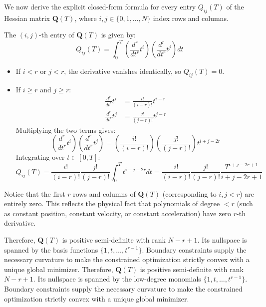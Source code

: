 \documentclass[11pt,a4paper]{article}
\begin{document}
We now derive the explicit closed-form formula for every entry $Q_{ij}(T)$ of the Hessian matrix $\mathbf{Q}(T)$, where $i, j \in \{0, 1, \dots, N\}$ index rows and columns.

\begin{definitionbox}
The $(i, j)$-th entry of $\mathbf{Q}(T)$ is given by:
\begin{equation}
Q_{ij}(T) = \int_0^T \left( \frac{d^r}{dt^r} t^i \right) \left( \frac{d^r}{dt^r} t^j \right) dt
\end{equation}
\begin{itemize}
    \item If $i < r$ or $j < r$, the derivative vanishes identically, so $Q_{ij}(T) = 0$.
    \item If $i \ge r$ and $j \ge r$:
    \begin{align}
    \frac{d^r}{dt^r} t^i &= \frac{i!}{(i-r)!} t^{i-r} \\
    \frac{d^r}{dt^r} t^j &= \frac{j!}{(j-r)!} t^{j-r}
    \end{align}
    Multiplying the two terms gives:
    \begin{equation}
    \left( \frac{d^r}{dt^r} t^i \right) \left( \frac{d^r}{dt^r} t^j \right) = \left( \frac{i!}{(i-r)!} \right) \left( \frac{j!}{(j-r)!} \right) t^{i + j - 2r}
    \end{equation}
    Integrating over $t \in [0, T]$:
    \begin{equation}
    \label{eq:Q_formula}
    Q_{ij}(T) = \frac{i!}{(i-r)!} \frac{j!}{(j-r)!} \int_0^T t^{i + j - 2r} dt
    = \frac{i!}{(i-r)!} \frac{j!}{(j-r)!} \frac{T^{i + j - 2r + 1}}{i + j - 2r + 1}
    \end{equation}
\end{itemize}
\end{definitionbox}

\begin{intuitionbox}
Notice that the first $r$ rows and columns of $\mathbf{Q}(T)$ (corresponding to $i, j < r$) are entirely zero. This reflects the physical fact that polynomials of degree $< r$ (such as constant position, constant velocity, or constant acceleration) have zero $r$-th derivative. 

Therefore, $\mathbf{Q}(T)$ is positive semi-definite with rank $N - r + 1$. Its nullspace is spanned by the basis functions $\{1, t, \dots, t^{r-1}\}$. Boundary constraints supply the necessary curvature to make the constrained optimization strictly convex with a unique global minimizer.
Therefore, $\mathbf{Q}(T)$ is positive semi-definite with rank $N - r + 1$. Its nullspace is spanned by the low-degree monomials $\{1, t, \dots, t^{r-1}\}$. Boundary constraints supply the necessary curvature to make the constrained optimization strictly convex with a unique global minimizer.
\end{intuitionbox}
\end{document}
